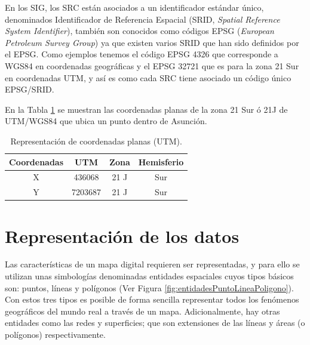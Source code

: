 En los SIG, los SRC están asociados a un identificador estándar único, denominados Identificador de Referencia Espacial (SRID, \textit{Spatial Reference System Identifier}), también son conocidos como códigos EPSG (\textit{European Petroleum Survey Group}) ya que existen varios SRID que han sido definidos por el EPSG. Como ejemplos tenemos el código EPSG 4326 que corresponde a WGS84 en coordenadas geográficas y el EPSG 32721 que es para la zona 21 Sur en coordenadas UTM, y así es como cada SRC tiene asociado un código único EPSG/SRID.

En la Tabla \ref{table:coordenadasPlanas} se muestran las coordenadas planas de la zona 21 Sur ó 21J de UTM/WGS84 que ubica un punto dentro de Asunción.

\begin{table}[H]
\caption{Representación de coordenadas planas (UTM).}
\centering
\begin{tabular}{cccc}
\hline
Coordenadas & UTM     & Zona & Hemisferio \\ \hline
X           & 436068  & 21 J & Sur        \\
Y           & 7203687 & 21 J & Sur        \\ \hline
\end{tabular}
\label{table:coordenadasPlanas}
\end{table}



\section{Representación de los datos}

Las características de un mapa digital requieren ser representadas, y para ello se utilizan unas simbologías denominadas entidades espaciales cuyos tipos básicos son: puntos, líneas y polígonos (Ver Figura \ref{fig:entidadesPuntoLineaPoligono}). Con estos tres tipos es posible de forma sencilla representar todos los fenómenos geográficos del mundo real a través de un mapa. Adicionalmente, hay otras entidades como las redes y superficies; que son extensiones de las líneas y áreas (o polígonos) respectivamente.


